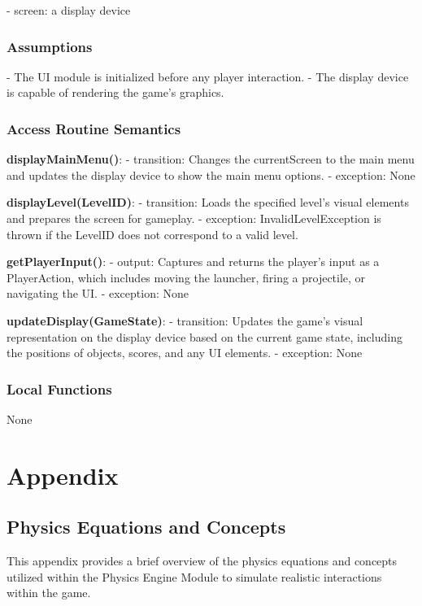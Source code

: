 \documentclass[12pt]{article}
\begin{document}
- screen: a display device

\subsubsection{Assumptions}

- The UI module is initialized before any player interaction.
- The display device is capable of rendering the game's graphics.

\subsubsection{Access Routine Semantics}

\textbf{displayMainMenu()}:
- transition: Changes the currentScreen to the main menu and updates the display device to show the main menu options.
- exception: None

\textbf{displayLevel(LevelID)}:
- transition: Loads the specified level's visual elements and prepares the screen for gameplay.
- exception: InvalidLevelException is thrown if the LevelID does not correspond to a valid level.

\textbf{getPlayerInput()}:
- output: Captures and returns the player's input as a PlayerAction, which includes moving the launcher, firing a projectile, or navigating the UI.
- exception: None

\textbf{updateDisplay(GameState)}:
- transition: Updates the game's visual representation on the display device based on the current game state, including the positions of objects, scores, and any UI elements.
- exception: None

\subsubsection{Local Functions}

None

\newpage
\section{Appendix}

\subsection{Physics Equations and Concepts}

This appendix provides a brief overview of the physics equations and concepts utilized within the Physics Engine Module to simulate realistic interactions within the game.
\end{document}
